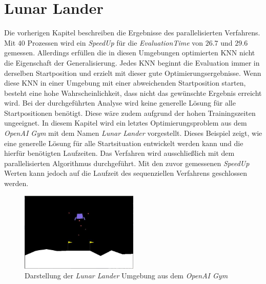 \section{Lunar Lander}
Die vorherigen Kapitel beschreiben die Ergebnisse des parallelisierten Verfahrens. Mit $40$ Prozessen wird ein \emph{SpeedUp} für die \emph{EvaluationTime} von $26.7$ und $29.6$ gemessen. Allerdings erfüllen die in diesen Umgebungen optimierten \ac{KNN} nicht die Eigenschaft der Generalisierung. Jedes \ac{KNN} beginnt die Evaluation immer in derselben Startposition und erzielt mit dieser gute Optimierungsergebnisse. Wenn diese \ac{KNN} in einer Umgebung mit einer abweichenden Startposition starten, besteht eine hohe Wahrscheinlichkeit, dass nicht das gewünschte Ergebnis erreicht wird. Bei der durchgeführten Analyse wird keine generelle Lösung für alle Startpositionen benötigt. Diese wäre zudem aufgrund der hohen Trainingszeiten ungeeignet. In diesem Kapitel wird ein letztes Optimierungsproblem aus dem \emph{OpenAI Gym} mit dem Namen \emph{Lunar Lander} vorgestellt. Dieses Beispiel zeigt, wie eine generelle Lösung für alle Startsituation entwickelt werden kann und die hierfür benötigten Laufzeiten. 
Das Verfahren wird ausschließlich mit dem parallelisierten Algorithmus durchgeführt. Mit den zuvor gemessenen \emph{SpeedUp} Werten kann jedoch auf die Laufzeit des sequenziellen Verfahrens geschlossen werden.
\begin{figure}[!h]
	\centering
	\includegraphics[width=0.5\textwidth]{./img/lunar_lander_env.JPG} 
	\caption{Darstellung der \emph{Lunar Lander} Umgebung aus dem \emph{OpenAI Gym}}
	\label{fig:lunar_lander_env}
\end{figure} 
\\\\
